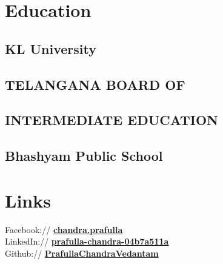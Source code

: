 \documentclass[]{deedy-resume-openfont}
\begin{document}
%
%
\lastupdated

%
%

%
%

\begin{minipage}[t]{0.33\textwidth} 


\section{Education} 
\subsection{KL University}
\sectionsep

\subsection{TELANGANA BOARD OF}
\subsection{INTERMEDIATE EDUCATION}
\sectionsep

\subsection{Bhashyam Public School}
\sectionsep


\section{Links} 
Facebook:// \href{https://www.facebook.com/chandra.prafulla}{\bf chandra.prafulla} \\
LinkedIn://  \href{http://linkedin.com/in/prafulla-chandra-04b7a511a}{\bf prafulla-chandra-04b7a511a} \\
Github://  \href{https://github.com/PrafullaChandraVedantam}{\bf PrafullaChandraVedantam} \\


\end{minipage}
\end{document}
